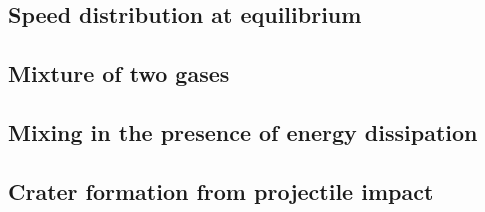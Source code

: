 \subsection{Speed distribution at equilibrium}\label{sec:eq}



\subsection{Mixture of two gases}\label{sec:mix1}



\subsection{Mixing in the presence of energy dissipation}\label{sec:mix2}



\subsection{Crater formation from projectile impact}\label{sec:crater}




